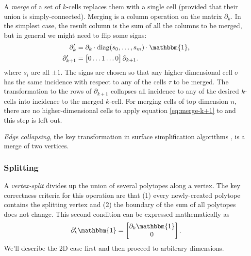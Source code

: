 \documentclass[twocolumn]{article}
\begin{document}
A \emph{merge} of a set of $k$-cells replaces them with a single cell (provided that their union is simply-connected).
Merging is a column operation on the matrix $\partial_k$.
In the simplest case, the result column is the sum of all the columns to be merged, but in general we might need to flip some signs:
\begin{align}
    \partial_k' & = \partial_k\cdot\text{diag}(s_0, \ldots, s_m)\cdot\mathbbm{1}, \\
    \partial_{k + 1}' & = \left[\begin{matrix} 0 \ldots 1 \ldots 0\end{matrix}\right]\partial_{k + 1}. \label{eq:merge-k+1}
\end{align}
where $s_i$ are all $\pm 1$.
The signs are chosen so that any higher-dimensional cell $\sigma$ has the same incidence with respect to any of the cells $\tau$ to be merged.
The transformation to the rows of $\partial_{k + 1}$ collapses all incidence to any of the desired $k$-cells into incidence to the merged $k$-cell.
For merging cells of top dimension $n$, there are no higher-dimensional cells to apply equation \eqref{eq:merge-k+1} to and this step is left out.

\emph{Edge collapsing}, the key transformation in surface simplification algorithms \cite{gueziec1995surface}, is a merge of two vertices.


\subsubsection{Splitting}

A \emph{vertex-split} divides up the union of several polytopes along a vertex.
The key correctness criteria for this operation are that (1) every newly-created polytope contains the splitting vertex and (2) the boundary of the sum of all polytopes does not change.
This second condition can be expressed mathematically as
\begin{equation}
    \partial_k'\mathbbm{1} = \left[\begin{matrix}\partial_k\mathbbm{1} \\ 0\end{matrix}\right].
    \label{eq:split-preserves-boundaries}
\end{equation}
We'll describe the 2D case first and then proceed to arbitrary dimensions.
\end{document}
